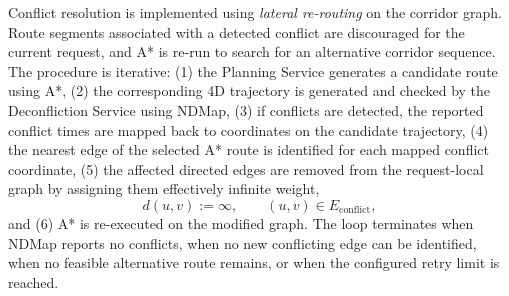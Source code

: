 Conflict resolution is implemented using \emph{lateral re-routing} on the corridor graph. Route segments associated with a detected conflict are discouraged for the current request, and A* is re-run to search for an alternative corridor sequence. The procedure is iterative:
(1) the Planning Service generates a candidate route using A*,
(2) the corresponding 4D trajectory is generated and checked by the Deconfliction Service using NDMap,
(3) if conflicts are detected, the reported conflict times are mapped back to coordinates on the candidate trajectory,
(4) the nearest edge of the selected A* route is identified for each mapped conflict coordinate,
(5) the affected directed edges are removed from the request-local graph by assigning them effectively infinite weight,
\[
  d(u,v) := \infty, \qquad (u,v)\in E_{\text{conflict}},
\]
and
(6) A* is re-executed on the modified graph.
The loop terminates when NDMap reports no conflicts, when no new conflicting edge can be identified, when no feasible alternative route remains, or when the configured retry limit is reached.

